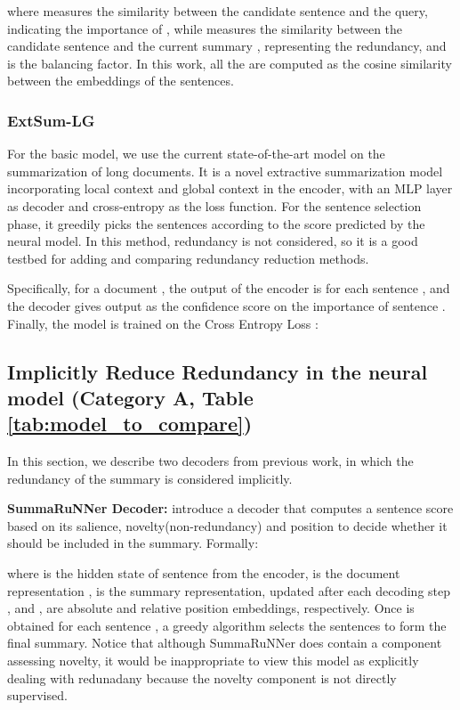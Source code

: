 \documentclass[11pt,a4paper]{article}
\begin{document}
where  measures the similarity between the candidate sentence  and the query, indicating the importance of , while   measures the similarity between the candidate sentence  and the current summary , representing the redundancy, and  is the balancing factor. In this work, all the  are computed as the cosine similarity between the embeddings of the sentences. 

\subsubsection*{ExtSum-LG}
For the basic model, we use the current state-of-the-art model \cite{xiao-carenini-2019-extractive} on the summarization of long documents. It is a novel extractive summarization model incorporating local context and global context in the encoder, with an MLP layer as decoder and cross-entropy as the loss function. For the sentence selection phase, it greedily picks the sentences according to the score predicted by the neural model. In this method, redundancy is not considered, so it is a good testbed for adding and comparing redundancy reduction methods.

Specifically, for a document , the output of the encoder is  for each sentence , and the decoder gives output  as the confidence score on the importance of sentence . Finally, the model is trained on the Cross Entropy Loss :
\vspace{-1mm}

\subsection{Implicitly Reduce Redundancy in the neural model (Category A, Table \ref{tab:model_to_compare})}
In this section, we describe two decoders from previous work, in which the redundancy of the summary is considered implicitly.


\textbf{SummaRuNNer Decoder:}
 introduce
a decoder that computes a sentence score based on its salience, novelty(non-redundancy) and position to decide whether it should be included in the summary.  
Formally: \vspace{-1mm}

\vspace{-1mm}
where  is the hidden state of sentence  from the encoder,  is the document representation 
,  is the summary representation, updated after each decoding step 
, and ,  are absolute and relative position embeddings, respectively.
Once  is obtained for each sentence , a greedy algorithm selects the sentences to form the final summary. Notice that although SummaRuNNer does contain a component assessing novelty, it would be inappropriate to view this model as explicitly dealing with redunadany because   the novelty component is not directly supervised.
\end{document}
